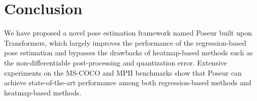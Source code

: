 \documentclass[runningheads]{llncs}
\def\handle{{Poseur}\xspace}
\begin{document}
\section{Conclusion}

We have proposed a novel pose estimation framework named \handle built upon Transformers, which largely improves the performance of the regression-based pose estimation and bypasses the drawbacks of heatmap-based methods such as the non-differentiable post-processing and quantization error.
Extensive experiments on the MS-COCO and MPII benchmarks show that \handle can achieve state-of-the-art performance among both regression-based methods and heatmap-based methods.





\clearpage







\end{document}
